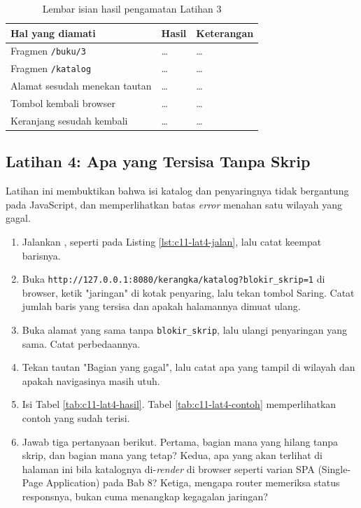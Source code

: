 \begin{table}[!htb]
  \centering
  \caption{Lembar isian hasil pengamatan Latihan 3}
  \label{tab:c11-lat3-hasil}
  \begin{tabularx}{\textwidth}{Xll}
    \hline
    \textbf{Hal yang diamati} & \textbf{Hasil} & \textbf{Keterangan} \\
    \hline
    Fragmen \texttt{/buku/3} & \dots & \dots \\
    \hline
    Fragmen \texttt{/katalog} & \dots & \dots \\
    \hline
    Alamat sesudah menekan tautan & \dots & \dots \\
    \hline
    Tombol kembali browser & \dots & \dots \\
    \hline
    Keranjang sesudah kembali & \dots & \dots \\
    \hline
  \end{tabularx}
\end{table}

\subsection*{Latihan 4: Apa yang Tersisa Tanpa Skrip}

Latihan ini membuktikan bahwa isi katalog dan penyaringnya tidak bergantung
pada JavaScript, dan memperlihatkan batas \textit{error} menahan satu wilayah
yang gagal.

\begin{enumerate}
  \item Jalankan , seperti pada Listing
        \ref{lst:c11-lat4-jalan}, lalu catat keempat barisnya.
  \item Buka \texttt{http://127.0.0.1:8080/kerangka/katalog?blokir\_skrip=1}
        di browser, ketik "jaringan" di kotak penyaring, lalu tekan tombol
        Saring. Catat jumlah baris yang tersisa dan apakah halamannya dimuat
        ulang.
  \item Buka alamat yang sama tanpa \texttt{blokir\_skrip}, lalu ulangi
        penyaringan yang sama. Catat perbedaannya.
  \item Tekan tautan "Bagian yang gagal", lalu catat apa yang tampil di
        wilayah dan apakah navigasinya masih utuh.
  \item Isi Tabel \ref{tab:c11-lat4-hasil}. Tabel \ref{tab:c11-lat4-contoh}
        memperlihatkan contoh yang sudah terisi.
  \item Jawab tiga pertanyaan berikut. Pertama, bagian mana yang hilang
        tanpa skrip, dan bagian mana yang tetap? Kedua, apa yang akan terlihat
        di halaman ini bila katalognya di-\textit{render} di browser seperti varian SPA
        (Single-Page Application) pada Bab 8? Ketiga, mengapa router
        memeriksa status responsnya, bukan cuma menangkap kegagalan jaringan?
\end{enumerate}

